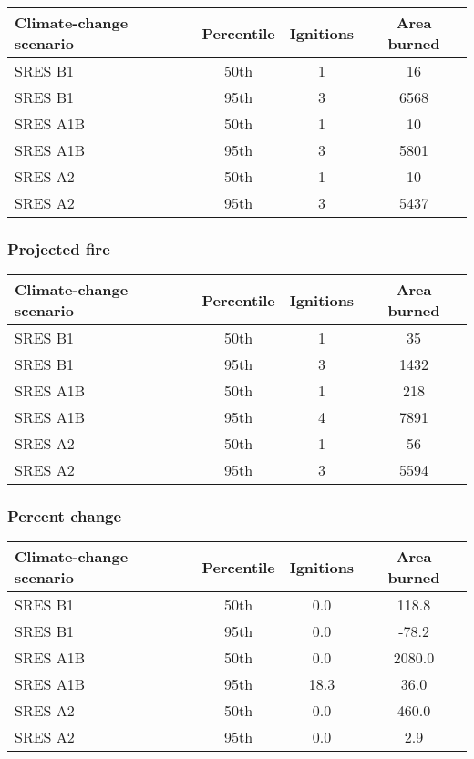 \documentclass{article}\usepackage[]{graphicx}\usepackage[]{color}
\newcommand{\headcol}{\rowcolor{tableheadcolor}}
\begin{document}
\begin{table}[ht]
\centering
\begin{tabular}{lccc}
  \headcol 
 \toprule
Climate-change scenario & Percentile & Ignitions & Area burned \\ 
  \midrule
SRES B1 & 50th & 1 & 16 \\ 
  SRES B1 & 95th & 3 & 6568 \\ 
  SRES A1B & 50th & 1 & 10 \\ 
  SRES A1B & 95th & 3 & 5801 \\ 
  SRES A2 & 50th & 1 & 10 \\ 
  SRES A2 & 95th & 3 & 5437 \\ 
   \bottomrule
\end{tabular}
\end{table}


\subsubsection{Projected fire}

\begin{table}[ht]
\centering
\begin{tabular}{lccc}
  \headcol 
 \toprule
Climate-change scenario & Percentile & Ignitions & Area burned \\ 
  \midrule
SRES B1 & 50th & 1 & 35 \\ 
  SRES B1 & 95th & 3 & 1432 \\ 
  SRES A1B & 50th & 1 & 218 \\ 
  SRES A1B & 95th & 4 & 7891 \\ 
  SRES A2 & 50th & 1 & 56 \\ 
  SRES A2 & 95th & 3 & 5594 \\ 
   \bottomrule
\end{tabular}
\end{table}


\subsubsection{Percent change}

\begin{table}[ht]
\centering
\begin{tabular}{lccc}
  \headcol 
 \toprule
Climate-change scenario & Percentile & Ignitions & Area burned \\ 
  \midrule
SRES B1 & 50th & 0.0 & 118.8 \\ 
  SRES B1 & 95th & 0.0 & -78.2 \\ 
  SRES A1B & 50th & 0.0 & 2080.0 \\ 
  SRES A1B & 95th & 18.3 & 36.0 \\ 
  SRES A2 & 50th & 0.0 & 460.0 \\ 
  SRES A2 & 95th & 0.0 & 2.9 \\ 
   \bottomrule
\end{tabular}
\end{table}
\end{document}
